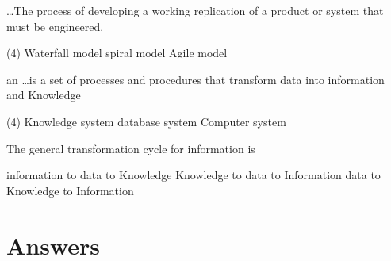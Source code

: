 \documentclass[10pt]{article}
\begin{document}
\begin{questions}
    \begin{exercise}
        \dots The process of developing a working replication of a product or system that must be engineered.
        \begin{choice}(4)
            \choice Waterfall model
            \choice {}
            \choice spiral model
            \choice Agile model
        \end{choice}
    \end{exercise}
    \begin{exercise}
        an \dots is a set of processes and procedures that transform data into information and Knowledge
        \begin{choice}(4)
            \choice {}
            \choice Knowledge system
            \choice database system
            \choice Computer system
        \end{choice}
    \end{exercise}
    \begin{exercise}
        The general transformation cycle for information is
        \begin{choice}
            \choice information to data to Knowledge
            \choice Knowledge to data to Information
            \choice data to Knowledge to Information
            \choice {}
        \end{choice}
    \end{exercise}
\end{questions}

\section*{Answers}
\getanswers
\end{document}
